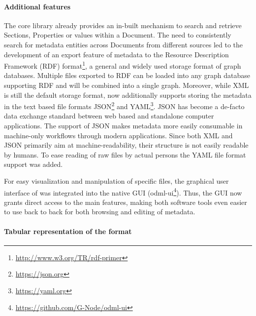 \paragraph{Additional features}
The  core library already provides an in-built mechanism to search and retrieve Sections, Properties or values within a Document. The need to consistently search for metadata entities across Documents from different sources led to the development of an export feature of  metadata to the Resource Description Framework (RDF) format\footnote{\url{http://www.w3.org/TR/rdf-primer}}, a general and widely used storage format of graph databases. Multiple  files exported to RDF can be loaded into any graph database supporting RDF and will be combined into a single graph. Moreover, while XML is still the default storage format,  now additionally supports storing the metadata in the text based file formats JSON\footnote{\url{https://json.org}} and YAML\footnote{\url{https://yaml.org}}. JSON has become a de-facto data exchange standard between web based and standalone computer applications. The support of JSON makes  metadata more easily consumable in machine-only workflows through modern applications. Since both XML and JSON primarily aim at machine-readability, their structure is not easily readable by humans. To ease reading of raw  files by actual persons the YAML file format support was added.

For easy visualization and manipulation of specific  files, the graphical user interface of  was integrated into the native  GUI (odml-ui\footnote{\url{https://github.com/G-Node/odml-ui}}). Thus, the  GUI now grants direct access to the main  features, making both software tools even easier to use back to back for both browsing and editing of metadata.

\paragraph{Tabular representation of the  format} 
\label{sec:tabular_format}

